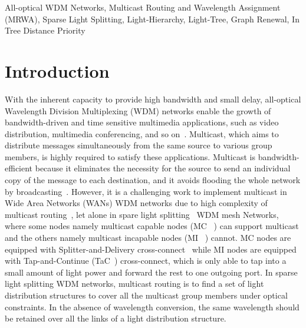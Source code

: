 \documentclass[conference]{IEEEtran}
\begin{document}
\begin{keywords}
All-optical WDM Networks, Multicast Routing and Wavelength Assignment (MRWA), Sparse Light Splitting, Light-Hierarchy, Light-Tree, Graph Renewal, In Tree Distance Priority
\end{keywords}




\IEEEpeerreviewmaketitle

\section{Introduction}
\label{introdcution}
With the inherent capacity to provide high bandwidth and small delay, all-optical Wavelength Division Multiplexing (WDM) networks enable the growth of bandwidth-driven and time sensitive multimedia applications, such as video distribution, multimedia conferencing, and so on~\cite{xdHu2004}. Multicast, which aims to distribute messages simultaneously from the same source to various group members, is highly required to satisfy these applications. Multicast is bandwidth-efficient because it eliminates the necessity for the source to send an individual copy of the message to each destination, and it avoids flooding the whole network by broadcasting~\cite{jyH2002}. However, it is a challenging work to implement multicast in Wide Area Networks (WANs) WDM networks due to high complexity of multicast routing~\cite{xdHu2004}, let alone in spare light splitting~\cite{rMalli1998} WDM mesh Networks, where some nodes namely multicast capable nodes (MC ~\cite{rMalli1998}) can support multicast and the others namely multicast incapable nodes (MI ~\cite{rMalli1998}) cannot. MC nodes are equipped with Splitter-and-Delivery cross-connect~\cite{mAli2000} while MI nodes are equipped with Tap-and-Continue (TaC~\cite{mAli2000Cost}) cross-connect, which is only able to tap into a small amount of light power and forward the rest to one outgoing port. In sparse light splitting WDM networks, multicast routing is to find a set of light distribution structures to cover all the multicast group members under optical constraints. In the absence of wavelength conversion, the same wavelength should be retained over all the links of a light distribution structure.
\end{document}
